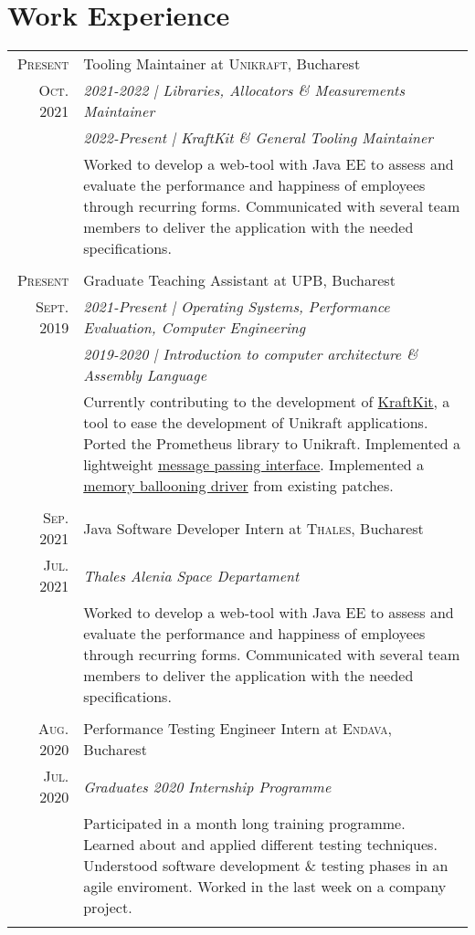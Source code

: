 \documentclass[a4paper,10pt]{article}
\begin{document}
\section{Work Experience}
\begin{tabular}{r|p{11cm}}
	\textsc{Present} & Tooling Maintainer at \textsc{Unikraft}, Bucharest \\
	\textsc{Oct. 2021} & \emph{2021-2022 | Libraries, Allocators \& Measurements Maintainer} \\&
	\emph{2022-Present | KraftKit \& General Tooling Maintainer} \\&
	\footnotesize
	{
		Worked to develop a web-tool with Java EE to assess and evaluate
		the performance and happiness of employees through recurring forms.
		Communicated with several team members to deliver the application
		with the needed specifications.
	} \\
	\multicolumn{2}{c}{} \\

	\textsc{Present} & Graduate Teaching Assistant at \textsc{UPB}, Bucharest \\
	\textsc{Sept. 2019} & \emph{2021-Present | Operating Systems, Performance Evaluation, Computer Engineering} \\&
	\emph{2019-2020 | Introduction to computer architecture \& Assembly Language} \\&
	\footnotesize
	{
		Currently contributing to the development of \href{https://github.com/unikraft/kraftkit/}{KraftKit}, a tool to ease the development of Unikraft applications.
		Ported the Prometheus library to Unikraft.
		Implemented a lightweight \href{https://github.com/unikraft/unikraft/pull/202}{message passing interface}.
		Implemented a \href{https://github.com/unikraft/unikraft/pull/219}{memory ballooning driver} from existing patches.
	} \\
	\multicolumn{2}{c}{} \\

	\textsc{Sep. 2021} & Java Software Developer Intern at \textsc{Thales}, Bucharest \\
	\textsc{Jul. 2021} & \emph{Thales Alenia Space Departament}\\&
	\footnotesize
	{
		Worked to develop a web-tool with Java EE to assess and evaluate
		the performance and happiness of employees through recurring forms.
		Communicated with several team members to deliver the application
		with the needed specifications.
	} \\
	\multicolumn{2}{c}{} \\

	\textsc{Aug. 2020} & Performance Testing Engineer Intern at \textsc{Endava}, Bucharest \\
	\textsc{Jul. 2020}&\emph{Graduates 2020 Internship Programme}\\&
	\footnotesize
	{
		Participated in a month long training programme.
		Learned about and applied different testing techniques.
		Understood software development \& testing phases in an agile enviroment.
		Worked in the last week on a company project.
	} \\
	\multicolumn{2}{c}{} \\
\end{tabular}
\end{document}
